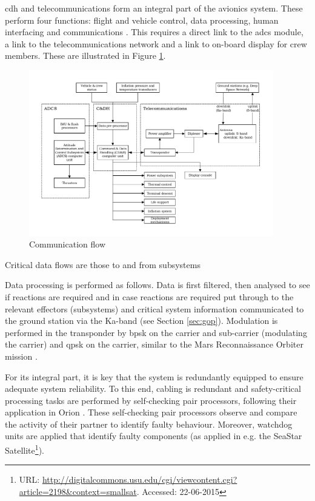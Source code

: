 \acrfull{cdh} and telecommunications form an integral part of the avionics system. These perform four functions: flight and vehicle control, data processing, human interfacing and communications \cite{Eger2008}. This requires a direct link to the \gls{adcs} module, a link to the telecommunications network and a link to on-board display for crew members. These are illustrated in Figure \ref{fig:cdhflow}.

\begin{figure}[h]
		\centering
		\includegraphics[width=0.95\textwidth]{./Figure/CrewModule/CDH.pdf}
		\caption{Communication flow}
		\label{fig:cdhflow}
\end{figure}

Critical data flows are those to and from subsystems

Data processing is performed as follows. Data is first filtered, then analysed to see if reactions are required and in case reactions are required put through to the relevant effectors (subsystems) and critical system information communicated to the ground station via the Ka-band (see Section \ref{sec:gop}). Modulation is performed in the transponder by \gls{bpsk} on the carrier and sub-carrier (modulating the carrier) and \gls{qpsk} on the carrier, similar to the Mars Reconnaissance Orbiter mission \cite{Taylor2006}.

For its integral part, it is key that the system is redundantly equipped to ensure adequate system reliability. To this end, cabling is redundant and safety-critical processing tasks are performed by self-checking pair processors, following their application in Orion \cite{Eger2008}. These self-checking pair processors observe and compare the activity of their partner to identify faulty behaviour. Moreover, watchdog units are applied that identify faulty components (as applied in e.g. the SeaStar Satellite\footnote{URL: \url{http://digitalcommons.usu.edu/cgi/viewcontent.cgi?article=2198&context=smallsat}. Accessed: 22-06-2015}).

